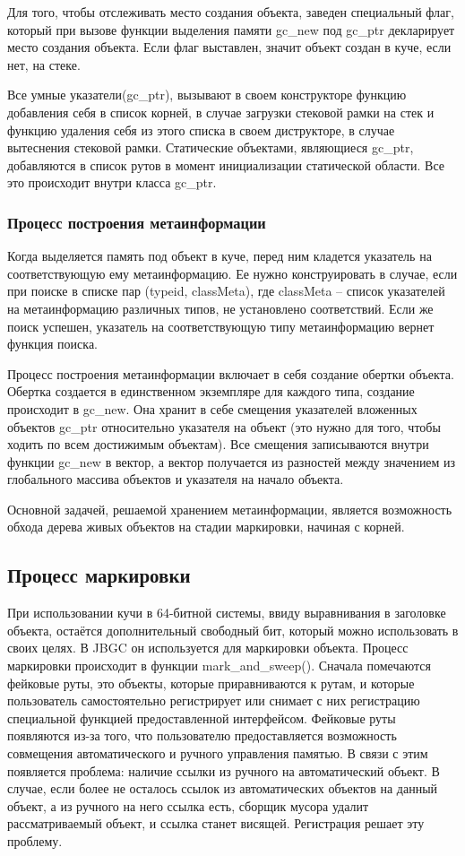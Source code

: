 Для того, чтобы отслеживать место создания объекта, заведен специальный флаг, который при вызове функции выделения памяти gc\_new  под gc\_ptr декларирует место создания объекта. Если флаг выставлен, значит объект создан в куче, если нет, на стеке.

Все умные указатели(gc\_ptr), вызывают в своем конструкторе функцию добавления себя в список корней, в случае загрузки стековой рамки на стек и функцию удаления себя из этого списка в своем диструкторе, в случае вытеснения стековой рамки. Статические объектами, являющиеся gc\_ptr, добавляются в список рутов в момент инициализации статической области. Все это происходит внутри класса gc\_ptr.


\subsubsection{Процесс построения метаинформации}
Когда выделяется память под объект в куче, перед ним кладется указатель на соответствующую ему метаинформацию. Ее нужно конструировать в случае, если при поиске в списке пар (typeid, classMeta), где classMeta -- список указателей на метаинформацию различных типов, не установлено соответствий. Если же поиск успешен, указатель на соответствующую типу метаинформацию вернет функция  поиска.

Процесс построения метаинформации включает в себя создание обертки объекта. Обертка создается в единственном экземпляре для каждого типа, создание происходит в gc\_new. Она хранит в себе смещения указателей вложенных объектов gc\_ptr относительно указателя на объект (это нужно для того, чтобы ходить по всем достижимым объектам). Все смещения записываются внутри функции gc\_new в вектор, а вектор получается из разностей между значением из глобального массива объектов и указателя на начало объекта. 

Основной задачей, решаемой хранением метаинформации, является возможность обхода дерева живых объектов на стадии маркировки, начиная с корней.

\subsection{Процесс маркировки}
При использовании кучи в 64-битной системы, ввиду выравнивания в заголовке объекта, остаётся дополнительный свободный бит, который можно использовать в своих целях. В JBGC он используется для маркировки объекта. Процесс маркировки происходит в функции mark\_and\_sweep(). 
Сначала помечаются фейковые руты, это объекты, которые приравниваются к рутам, и которые пользователь самостоятельно регистрирует или снимает с них регистрацию специальной функцией предоставленной интерфейсом.  Фейковые руты появляются из-за того, что пользователю  предоставляется возможность совмещения автоматического и ручного управления памятью. В связи с этим появляется проблема: наличие ссылки из ручного на автоматический объект. В случае, если более не осталось ссылок из автоматических объектов на данный объект, а из ручного на него ссылка есть, сборщик мусора удалит рассматриваемый объект, и ссылка станет висящей. Регистрация решает эту проблему.


